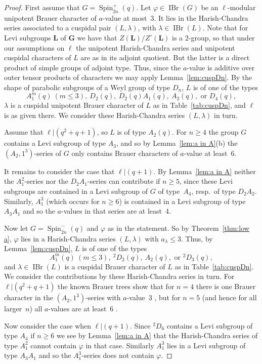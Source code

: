 \documentclass[12pt,leqno,a4paper]{amsart}
\newcommand{\bG}{{\mathbf{G}}}
\newcommand{\bL}{{\mathbf{L}}}
\newcommand{\IBr}{{\operatorname{IBr}}}
\newcommand{\Spin}{{\operatorname{Spin}}}
\newcommand{\tw}[1]{{}^{#1}\!}
\let\la=\lambda
\let\vhi=\varphi
\theoremstyle{remark}
\begin{document}
\begin{proof}
First assume that $G=\Spin_{2n}^+(q)$. Let $\vhi\in\IBr(G)$ be an
$\ell$-modular unipotent Brauer character of $a$-value at most~3. It lies in
the Harish-Chandra series associated to a cuspidal pair $(L,\la)$, with
$\la\in\IBr(L)$. Note that for Levi subgroups $\bL$ of $\bG$ we have that
$Z(\bL)/Z^\circ(\bL)$ is a 2-group, so that under our assumptions on $\ell$
the unipotent Harish-Chandra series and unipotent cuspidal characters of
$L$ are as in its adjoint quotient. But the latter is a direct
product of simple groups of adjoint type. Thus, since the $a$-value is
additive over outer tensor products of characters we may apply
Lemma~\ref{lem:cuspDn}. By the shape of parabolic subgroups of a Weyl group
of type $D_n$, $L$ is of one of the types
$$A_1^m(q)\ (m\le3),\ D_2(q),\ D_2(q)A_1(q),\ A_2(q), \text{ or } D_4(q),$$
$\la$ is a cuspidal unipotent Brauer character of $L$ as in
Table~\ref{tab:cuspDn}, and $\ell$ is as given there. We consider these
Harish-Chandra series $(L,\la)$ in turn.   \par
Assume that $\ell|(q^2+q+1)$, so $L$ is of type $A_2(q)$. For $n\ge4$ the
group $G$ contains a Levi subgroup of type $A_3$, and so by
Lemma~\ref{lem:a in A}(b) the $(A_2,1^3)$-series of $G$ only contains Brauer
characters of $a$-value at least~$6$.
\par
It remains to consider the case that $\ell|(q+1)$. By Lemma~\ref{lem:a in A}
neither the $A_1^2$-series nor the $D_2A_1$-series can contribute if $n\ge5$,
since these Levi subgroups are contained in a Levi subgroup of $G$ of
type~$A_4$, resp.~of type $D_2A_2$. Similarly, $A_1^3$ (which occurs for
$n\ge6$) is contained in a Levi subgroup of type $A_3A_1$ and so
the $a$-values in that series are at least~4.
\par
Now let $G=\Spin_{2n}^-(q)$ and $\vhi$ as in the statement. So by
Theorem~\ref{thm:low a}, $\vhi$ lies in a Harish-Chandra series $(L,\la)$
with $a_\la\le3$. Thus, by Lemma~\ref{lem:cuspDn}, $L$ is of one of the types
$$A_1^m(q)\ (m\le3),\ \tw2D_2(q),\ A_2(q), \text{ or } \tw2D_3(q),$$
and $\la\in\IBr(L)$ is a cuspidal Brauer character of $L$ as in
Table~\ref{tab:cuspDn}. We consider the contributions by these Harish-Chandra
series in turn. For $\ell|(q^2+q+1)$ the known Brauer trees show that for $n=4$
there is one Brauer character in the $(A_2,1^3)$-series with $a$-value~3 ,
but for $n=5$ (and hence for all larger~$n$) all $a$-values are at least~6 .
\par
Now consider the case when $\ell|(q+1)$. Since $\tw2D_6$ contains a Levi
subgroup of type $A_4$ if $n\ge6$ we see by Lemma~\ref{lem:a in A} that the
Harish-Chandra series of type $A_1^2$ cannot contain $\vhi$ in that case.
Similarly $A_1^3$ lies in a Levi subgroup of type $A_3A_1$ and so the
$A_1^3$-series does not contain $\vhi$.
\end{proof}
\end{document}
